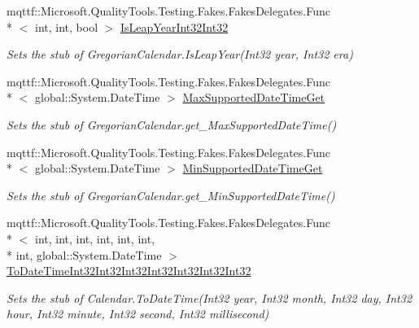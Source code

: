 \begin{DoxyCompactItemize}
mqttf\-::\-Microsoft.\-Quality\-Tools.\-Testing.\-Fakes.\-Fakes\-Delegates.\-Func\\*
$<$ int, int, bool $>$ \hyperlink{class_system_1_1_globalization_1_1_fakes_1_1_stub_gregorian_calendar_aa17f6553f942511f3205dcbdfc0fee5b}{Is\-Leap\-Year\-Int32\-Int32}
\begin{DoxyCompactList}\small\item\em Sets the stub of Gregorian\-Calendar.\-Is\-Leap\-Year(\-Int32 year, Int32 era)\end{DoxyCompactList}\item 
mqttf\-::\-Microsoft.\-Quality\-Tools.\-Testing.\-Fakes.\-Fakes\-Delegates.\-Func\\*
$<$ global\-::\-System.\-Date\-Time $>$ \hyperlink{class_system_1_1_globalization_1_1_fakes_1_1_stub_gregorian_calendar_a23dd26209f346485912c6c6e933c44c7}{Max\-Supported\-Date\-Time\-Get}
\begin{DoxyCompactList}\small\item\em Sets the stub of Gregorian\-Calendar.\-get\-\_\-\-Max\-Supported\-Date\-Time()\end{DoxyCompactList}\item 
mqttf\-::\-Microsoft.\-Quality\-Tools.\-Testing.\-Fakes.\-Fakes\-Delegates.\-Func\\*
$<$ global\-::\-System.\-Date\-Time $>$ \hyperlink{class_system_1_1_globalization_1_1_fakes_1_1_stub_gregorian_calendar_ab023a40e3c856bc92220e180fd58a663}{Min\-Supported\-Date\-Time\-Get}
\begin{DoxyCompactList}\small\item\em Sets the stub of Gregorian\-Calendar.\-get\-\_\-\-Min\-Supported\-Date\-Time()\end{DoxyCompactList}\item 
mqttf\-::\-Microsoft.\-Quality\-Tools.\-Testing.\-Fakes.\-Fakes\-Delegates.\-Func\\*
$<$ int, int, int, int, int, int, \\*
int, global\-::\-System.\-Date\-Time $>$ \hyperlink{class_system_1_1_globalization_1_1_fakes_1_1_stub_gregorian_calendar_affc2bfa6292b0cd67f842bf5ce42a9e0}{To\-Date\-Time\-Int32\-Int32\-Int32\-Int32\-Int32\-Int32\-Int32}
\begin{DoxyCompactList}\small\item\em Sets the stub of Calendar.\-To\-Date\-Time(\-Int32 year, Int32 month, Int32 day, Int32 hour, Int32 minute, Int32 second, Int32 millisecond)\end{DoxyCompactList}\item 

\end{DoxyCompactItemize}
